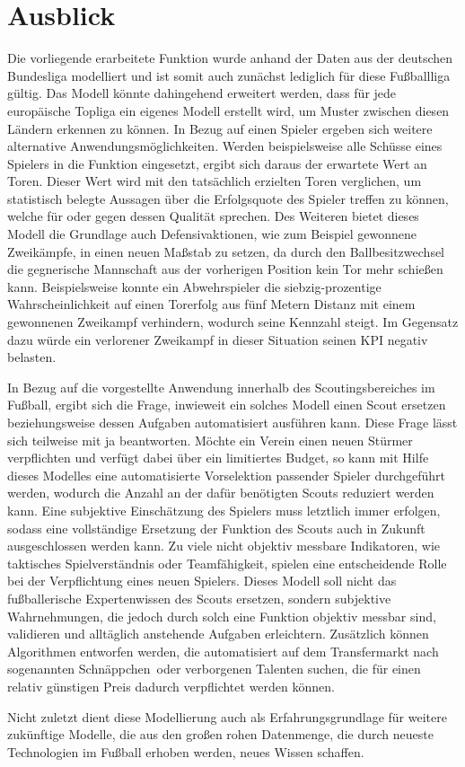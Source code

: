 \section{Ausblick}
\label{ausblick}

Die vorliegende erarbeitete Funktion wurde anhand der Daten aus der deutschen Bundesliga modelliert und ist somit auch zunächst lediglich für diese Fußballliga gültig. Das Modell könnte dahingehend erweitert werden, dass für jede europäische Topliga ein eigenes Modell erstellt wird, um Muster zwischen diesen Ländern erkennen zu können. In Bezug auf einen Spieler ergeben sich weitere alternative Anwendungsmöglichkeiten. Werden beispielsweise alle Schüsse eines Spielers in die Funktion eingesetzt, ergibt sich daraus der erwartete Wert an Toren. Dieser Wert wird mit den tatsächlich erzielten Toren verglichen, um statistisch belegte Aussagen über die Erfolgsquote des Spieler treffen zu können, welche für oder gegen dessen Qualität sprechen. Des Weiteren bietet dieses Modell die Grundlage auch Defensivaktionen, wie zum Beispiel gewonnene Zweikämpfe, in einen neuen Maßstab zu setzen, da durch den Ballbesitzwechsel die gegnerische Mannschaft aus der vorherigen Position kein Tor mehr schießen kann. Beispielsweise konnte ein Abwehrspieler die siebzig-prozentige Wahrscheinlichkeit auf einen Torerfolg aus fünf Metern Distanz mit einem gewonnenen Zweikampf verhindern, wodurch seine Kennzahl steigt. Im Gegensatz dazu würde ein verlorener Zweikampf in dieser Situation seinen KPI negativ belasten.

In Bezug auf die vorgestellte Anwendung innerhalb des Scoutingsbereiches im Fußball, ergibt sich die Frage, inwieweit ein solches Modell einen Scout ersetzen beziehungsweise dessen Aufgaben automatisiert ausführen kann. Diese Frage lässt sich teilweise mit ja beantworten. Möchte ein Verein einen neuen Stürmer verpflichten und verfügt dabei über ein limitiertes Budget, so kann mit Hilfe dieses Modelles eine automatisierte Vorselektion passender Spieler durchgeführt werden, wodurch die Anzahl an der dafür benötigten Scouts reduziert werden kann. Eine subjektive Einschätzung des Spielers muss letztlich immer erfolgen, sodass eine vollständige Ersetzung der Funktion des Scouts auch in Zukunft ausgeschlossen werden kann. Zu viele nicht objektiv messbare Indikatoren, wie taktisches Spielverständnis oder Teamfähigkeit, spielen eine entscheidende Rolle bei der Verpflichtung eines neuen Spielers. Dieses Modell soll nicht das fußballerische Expertenwissen des Scouts ersetzen, sondern subjektive Wahrnehmungen, die jedoch durch solch eine Funktion objektiv messbar sind, validieren und alltäglich anstehende Aufgaben erleichtern. Zusätzlich können Algorithmen entworfen werden, die automatisiert auf dem Transfermarkt nach sogenannten \glqq Schnäppchen\grqq~oder verborgenen Talenten suchen, die für einen relativ günstigen Preis dadurch verpflichtet werden können. 

Nicht zuletzt dient diese Modellierung auch als Erfahrungsgrundlage für weitere zukünftige Modelle, die aus den großen rohen Datenmenge, die durch neueste Technologien im Fußball erhoben werden, neues Wissen schaffen.